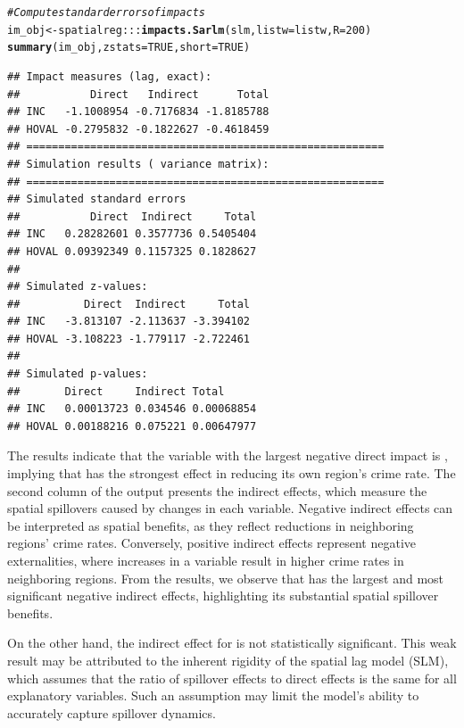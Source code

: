 \documentclass[english,12pt]{book}\usepackage[]{graphicx}\usepackage[]{xcolor}
\makeatletter
\newcommand{\hlnum}[1]{\textcolor[rgb]{0.686,0.059,0.569}{#1}}%
\newcommand{\hlcom}[1]{\textcolor[rgb]{0.678,0.584,0.686}{\textit{#1}}}%
\newcommand{\hlopt}[1]{\textcolor[rgb]{0,0,0}{#1}}%
\newcommand{\hldef}[1]{\textcolor[rgb]{0.345,0.345,0.345}{#1}}%
\newcommand{\hlkwb}[1]{\textcolor[rgb]{0.69,0.353,0.396}{#1}}%
\newcommand{\hlkwc}[1]{\textcolor[rgb]{0.333,0.667,0.333}{#1}}%
\newcommand{\hlkwd}[1]{\textcolor[rgb]{0.737,0.353,0.396}{\textbf{#1}}}%
\newenvironment{kframe}{%
 \def\at@end@of@kframe{}%
 \ifinner\ifhmode%
  \def\at@end@of@kframe{\end{minipage}}%
  \begin{minipage}{\columnwidth}%
 \fi\fi%
 \def\FrameCommand##1{\hskip\@totalleftmargin \hskip-\fboxsep
 \colorbox{shadecolor}{##1}\hskip-\fboxsep
     \hskip-\linewidth \hskip-\@totalleftmargin \hskip\columnwidth}%
 \MakeFramed {\advance\hsize-\width
   \@totalleftmargin\z@ \linewidth\hsize
   \@setminipage}}%
 {\par\unskip\endMakeFramed%
 \at@end@of@kframe}
\newenvironment{knitrout}{}{} %
\makeatother
\begin{document}
\begin{knitrout}
\color{fgcolor}\begin{kframe}
\begin{alltt}
\hlcom{# Compute standard errors of impacts}
\hldef{im_obj} \hlkwb{<-} \hldef{spatialreg}\hlopt{:::}\hlkwd{impacts.Sarlm}\hldef{(slm,} \hlkwc{listw} \hldef{= listw,} \hlkwc{R} \hldef{=} \hlnum{200}\hldef{)}
\hlkwd{summary}\hldef{(im_obj,} \hlkwc{zstats} \hldef{=} \hlnum{TRUE}\hldef{,} \hlkwc{short} \hldef{=} \hlnum{TRUE}\hldef{)}
\end{alltt}
\begin{verbatim}
## Impact measures (lag, exact):
##           Direct   Indirect      Total
## INC   -1.1008954 -0.7176834 -1.8185788
## HOVAL -0.2795832 -0.1822627 -0.4618459
## ========================================================
## Simulation results ( variance matrix):
## ========================================================
## Simulated standard errors
##           Direct  Indirect     Total
## INC   0.28282601 0.3577736 0.5405404
## HOVAL 0.09392349 0.1157325 0.1828627
## 
## Simulated z-values:
##          Direct  Indirect     Total
## INC   -3.813107 -2.113637 -3.394102
## HOVAL -3.108223 -1.779117 -2.722461
## 
## Simulated p-values:
##       Direct     Indirect Total     
## INC   0.00013723 0.034546 0.00068854
## HOVAL 0.00188216 0.075221 0.00647977
\end{verbatim}
\end{kframe}
\end{knitrout}

The results indicate that the variable with the largest negative direct impact is , implying that  has the strongest effect in reducing its own region’s crime rate. The second column of the output presents the indirect effects, which measure the spatial spillovers caused by changes in each variable. Negative indirect effects can be interpreted as spatial benefits, as they reflect reductions in neighboring regions’ crime rates. Conversely, positive indirect effects represent negative externalities, where increases in a variable result in higher crime rates in neighboring regions. From the results, we observe that  has the largest and most significant negative indirect effects, highlighting its substantial spatial spillover benefits. 

On the other hand, the indirect effect for  is not statistically significant. This weak result may be attributed to the inherent rigidity of the spatial lag model (SLM), which assumes that the ratio of spillover effects to direct effects is the same for all explanatory variables. Such an assumption may limit the model’s ability to accurately capture spillover dynamics.
\end{document}
